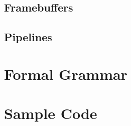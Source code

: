 \documentclass[11pt]{article}
\begin{document}
\subsection{Framebuffers}

\subsection{Pipelines}

\section{Formal Grammar}

\section{Sample Code}
\end{document}
